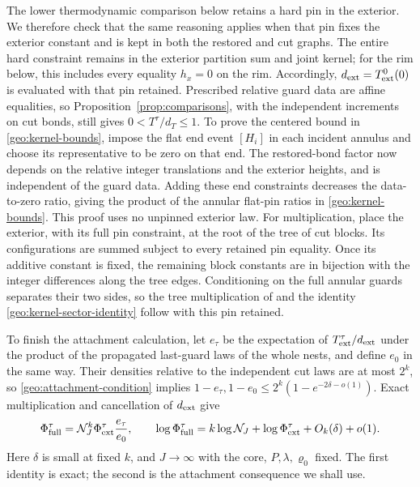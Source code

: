 The lower thermodynamic comparison below retains a hard pin in the
exterior.  We therefore check that the same reasoning applies when
that pin fixes the exterior constant and is kept in both the restored
and cut graphs.  The entire hard constraint remains in the exterior
partition sum and joint kernel; for the rim below, this includes every
equality \(h_x=0\) on the rim.  Accordingly,
\(d_{\rm ext}=T_{\rm ext}^0(0)\) is evaluated with that pin retained.
Prescribed relative guard data are affine equalities, so
Proposition~\ref{prop:comparisons}, with the independent increments
on cut bonds, still gives \(0<T^\tau/d_T\le1\).  To prove the centered
bound in \eqref{geo:kernel-bounds}, impose the flat end event \([H_i]\)
in each incident annulus and choose its representative to be zero on
that end.  The restored-bond factor now depends on the relative integer
translations and the exterior heights, and is independent of the
guard data.  Adding these end constraints decreases the data-to-zero
ratio, giving the product of the annular flat-pin ratios in
\eqref{geo:kernel-bounds}.  This proof uses no unpinned exterior law.
For multiplication, place the exterior, with its full pin constraint,
at the root of the tree of cut blocks.  Its configurations are summed
subject to every retained pin equality.  Once its additive constant is
fixed, the remaining block constants are in bijection with the integer
differences along the tree edges.  Conditioning on the full annular guards
separates their two sides, so the tree multiplication of
\cite[Lemma~5.2]{S} and the identity
\eqref{geo:kernel-sector-identity} follow with this pin retained.

To finish the attachment calculation, let \(e_\tau\) be the expectation
of \(T^\tau_{\rm ext}/d_{\rm ext}\) under the product of the propagated
last-guard laws of the whole nests, and define \(e_0\) in the same way.
Their densities relative to the independent cut laws are at most
\(2^k\), so \eqref{geo:attachment-condition} implies
\(1-e_\tau,1-e_0\le 2^k(1-e^{-2\delta-o(1)})\).
Exact multiplication and cancellation of \(d_{\rm ext}\) give
\begin{equation}\label{geo:attachment-factorization}
 \Phi_{\rm full}^\tau
       =\mathcal N_J^k\Phi_{\rm ext}^\tau\frac{e_\tau}{e_0},
 \qquad
 \log\Phi_{\rm full}^\tau
       =k\log\mathcal N_J+\log\Phi_{\rm ext}^\tau
                              +O_k(\delta)+o(1).
\end{equation}
Here \(\delta\) is small at fixed \(k\), and \(J\to\infty\) with
the core, \(P,\lambda,\varrho_0\) fixed.  The first identity is exact;
the second is the attachment consequence we shall use.

